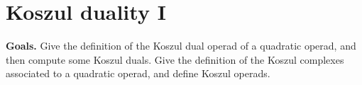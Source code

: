\documentclass[fleqn,a4paper, twoside]{article}
\makeatletter
\newcommand{\0}{\langle 0\rangle}
\newcommand{\End}{\operatorname{End}}
\newenvironment{tenumerate}{
 \begin{enumerate}
  \setlength{\itemsep}{0pt}
  \setlength{\parskip}{0pt}
}{\end{enumerate}}
\let\[\@undefined
\DeclareRobustCommand{\[}{\begin{equation}}%
\let\]\@undefined
\DeclareRobustCommand{\]}{\end{equation}}%
\theoremstyle{mytheorem}
\theoremstyle{introthm}
\theoremstyle{mydefinition}
\newtheorem{definition}[theorem]{Definition}
\theoremstyle{mydefinition2}
\theoremstyle{plain} %
\newcommand{\?}{\,?\,}
\newcommand{\PP}{{\mathcal{P}}}
\theoremstyle{mytheorem}
\theoremstyle{plain} %
\makeatother
\begin{document}
% 
%
%
%
%
%
%
%
%

 \section{Koszul duality I}
\textbf{Goals.}
Give the definition of the Koszul dual
operad of a quadratic operad, and then compute
some Koszul duals. Give the definition of the
Koszul complexes associated to a quadratic operad,
and define Koszul operads.
\end{document}
